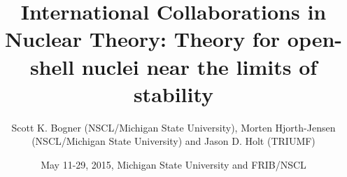 \documentclass{beamer}
\begin{document}




\title{International Collaborations in Nuclear Theory: Theory for open-shell nuclei near the limits of stability}


\author{Scott K. Bogner (NSCL/Michigan State University), Morten Hjorth-Jensen (NSCL/Michigan State University) and Jason D. Holt (TRIUMF)\inst{}}
\institute{}


\date{May 11-29, 2015, Michigan State University and FRIB/NSCL
}

\begin{frame}
\titlepage
\end{frame}
\end{document}
